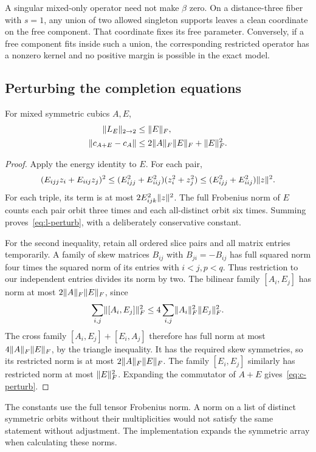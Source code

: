 A singular mixed-only operator need not make $\beta$ zero. On a distance-three fiber with $s=1$, any union of two allowed singleton supports leaves a clean coordinate on the free component. That coordinate fixes its free parameter. Conversely, if a free component fits inside such a union, the corresponding restricted operator has a nonzero kernel and no positive margin is possible in the exact model.

\subsection{Perturbing the completion equations}
\begin{lemma}\label{lem:perturbation}
For mixed symmetric cubics $A,E$,
\begin{align}
 \lVert L_E\rVert_{2\to2}&\le\lVert E\rVert_F,\label{eq:l-perturb}\\
 \lVert c_{A+E}-c_A\rVert&\le2\lVert A\rVert_F\lVert E\rVert_F+\lVert E\rVert_F^2.\label{eq:c-perturb}
\end{align}
\end{lemma}
\begin{proof}
Apply the energy identity to $E$. For each pair,
\[
 (E_{ijj}z_i+E_{iij}z_j)^2
 \le(E_{ijj}^2+E_{iij}^2)(z_i^2+z_j^2)
 \le(E_{ijj}^2+E_{iij}^2)\lVert z\rVert^2.
\]
For each triple, its term is at most $2E_{ijk}^2\lVert z\rVert^2$. The full Frobenius norm of $E$ counts each pair orbit three times and each all-distinct orbit six times. Summing proves~\eqref{eq:l-perturb}, with a deliberately conservative constant.

For the second inequality, retain all ordered slice pairs and all matrix entries temporarily. A family of skew matrices $B_{ij}$ with $B_{ji}=-B_{ij}$ has full squared norm four times the squared norm of its entries with $i<j,p<q$. Thus restriction to our independent entries divides its norm by two. The bilinear family $[A_i,E_j]$ has norm at most $2\lVert A\rVert_F\lVert E\rVert_F$, since
\[
 \sum_{i,j}\lVert [A_i,E_j]\rVert_F^2
 \le4\sum_{i,j}\lVert A_i\rVert_F^2\lVert E_j\rVert_F^2.
\]
The cross family $[A_i,E_j]+[E_i,A_j]$ therefore has full norm at most $4\lVert A\rVert_F\lVert E\rVert_F$, by the triangle inequality. It has the required skew symmetries, so its restricted norm is at most $2\lVert A\rVert_F\lVert E\rVert_F$. The family $[E_i,E_j]$ similarly has restricted norm at most $\lVert E\rVert_F^2$. Expanding the commutator of $A+E$ gives~\eqref{eq:c-perturb}.
\end{proof}

The constants use the full tensor Frobenius norm. A norm on a list of distinct symmetric orbits without their multiplicities would not satisfy the same statement without adjustment. The implementation expands the symmetric array when calculating these norms.

